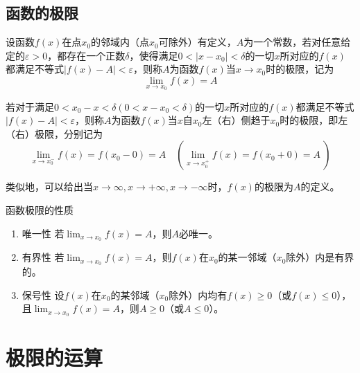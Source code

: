 \subsection{函数的极限}
\begin{definition}[函数的极限] \label{def:function_limit}
    设函数$f(x)$在点$x_0$的邻域内（点$x_0$可除外）有定义，$A$为一个常数，若对任意给定的$\varepsilon > 0$，都存在一个正数$\delta$，使得满足$0<\left|x-x_0\right|<\delta$的一切$x$所对应的$f(x)$都满足不等式$\left|f(x)-A\right|<\varepsilon$，则称$A$为函数$f(x)$当$x\rightarrow x_0$时的极限，记为
    \begin{equation}
        \lim_{x\rightarrow x_0} f(x)=A \nonumber
    \end{equation}

    若对于满足$0<x_0-x<\delta(0<x-x_0<\delta)$的一切$x$所对应的$f(x)$都满足不等式$\left|f(x)-A\right|<\varepsilon$，则称$A$为函数$f(x)$当$x$自$x_0$左（右）侧趋于$x_0$时的极限，即左（右）极限，分别记为
    \begin{equation}
        \lim_{x\rightarrow x_0^-} f(x) = f(x_0 -0) = A \quad (\lim_{x\rightarrow x_0^+} f(x) = f(x_0 +0) = A \ ) \nonumber
    \end{equation}

    类似地，可以给出当$x\rightarrow\infty,x\rightarrow +\infty, x\rightarrow -\infty$时，$f(x)$的极限为$A$的定义。
\end{definition}

\begin{property} 函数极限的性质 \label{property:function_limit}
    \begin{enumerate}
        \item 唯一性 \quad 若$\displaystyle\lim_{x\rightarrow x_0} f(x) = A$，则$A$必唯一。
        \item 有界性 \quad 若$\displaystyle\lim_{x\rightarrow x_0} f(x) = A$，则$f(x)$在$x_0$的某一邻域（$x_0$除外）内是有界的。
        \item 保号性 \quad 设$f(x)$在$x_0$的某邻域（$x_0$除外）内均有$f(x)\geq 0$（或$f(x)\leq 0$），且$\displaystyle\lim_{x\rightarrow x_0} f(x) = A$，则$A\geq 0$（或$A\leq 0$）。
    \end{enumerate}
\end{property}

\section{极限的运算}
